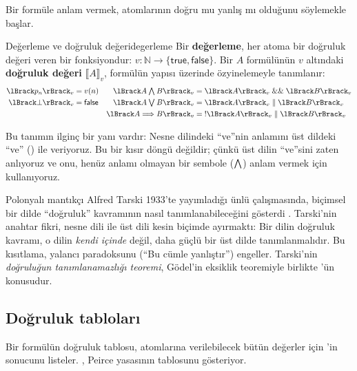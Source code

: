 Bir formüle anlam vermek, atomlarının doğru mu yanlış mı olduğunu
söylemekle başlar.

\begin{tanim}{Değerleme ve doğruluk değeri}{degerleme}
Bir \textbf{değerleme}, her atoma bir doğruluk değeri veren bir
fonksiyondur: $v : \mathbb{N} \to \{\mathsf{true}, \mathsf{false}\}$.
Bir $A$ formülünün $v$ altındaki \textbf{doğruluk değeri} $\lBrack A
\rBrack_v$, formülün yapısı üzerinde özyinelemeyle tanımlanır:
\begin{align*}
\lBrack p_n \rBrack_v &= v(n) &
\lBrack A \ove B \rBrack_v &= \lBrack A \rBrack_v \;\&\&\; \lBrack B \rBrack_v \\
\lBrack \bot \rBrack_v &= \mathsf{false} &
\lBrack A \oveya B \rBrack_v &= \lBrack A \rBrack_v \;\|\; \lBrack B \rBrack_v \\
& & \lBrack A \oise B \rBrack_v &= \mathord{!}\lBrack A \rBrack_v \;\|\; \lBrack B \rBrack_v
\end{align*}
\end{tanim}


\noindent Bu tanımın ilginç bir yanı vardır: Nesne dilindeki ``ve''nin
anlamını üst dildeki ``ve'' (\lc{\&\&}) ile veriyoruz. Bu bir kısır döngü
değildir; çünkü üst dilin ``ve''sini zaten anlıyoruz ve onu, henüz anlamı
olmayan bir sembole ($\mathbin{\textstyle\bigwedge}$) anlam vermek için kullanıyoruz.

\begin{tarihce}
Polonyalı mantıkçı Alfred Tarski 1933'te yayımladığı ünlü çalışmasında,
biçimsel bir dilde ``doğruluk'' kavramının nasıl tanımlanabileceğini
gösterdi \citep{tarski1933}. Tarski'nin anahtar fikri, nesne dili ile
üst dili kesin biçimde ayırmaktı: Bir dilin doğruluk kavramı, o dilin
\emph{kendi içinde} değil, daha güçlü bir üst dilde tanımlanmalıdır. Bu
kısıtlama, yalancı paradoksunu (``Bu cümle yanlıştır'') engeller.
Tarski'nin \emph{doğruluğun tanımlanamazlığı teoremi}, Gödel'in eksiklik
teoremiyle birlikte 'ün konusudur.
\end{tarihce}


\subsection{Doğruluk tabloları}

Bir formülün doğruluk tablosu, atomlarına verilebilecek bütün değerler
için 'in sonucunu listeler. , Peirce
yasasının tablosunu gösteriyor.

